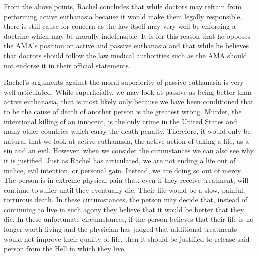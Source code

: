 \documentclass{article}
\begin{document}
From the above points, Rachel concludes that while doctors may refrain from performing
active euthanasia because it would make them legally responsible, there is still cause
for concern as the law itself may very well be enforcing a doctrine which may be morally
indefensible. It is for this reason that he opposes the AMA's position on active and
passive euthanasia and that while he believes that doctors should follow the law
medical authorities such as the AMA should not endorse it in their official statements.

Rachel's arguments against the moral superiority of passive euthanasia is very well-articulated.
While superficially, we may look at passive as being better than active euthanasia,
that is most likely only because we have been conditioned that to be the cause of
death of another person is the greatest wrong. Murder, the intentional killing of
an innocent, is the only crime in the United States and many other countries which
carry the death penalty. Therefore, it would only be natural that we look at active
euthanasia, the active action of taking a life, as a sin and an evil. However, when
we consider the cirumstances we can also see why it is justified. Just as Rachel has
articulated, we are not ending a life out of malice, evil intention, or personal gain.
Instead, we are doing so out of mercy. The person is in extreme physical pain that,
even if they receive treatment, will continue to suffer until they eventually die.
Their life would be a slow, painful, torturous death. In these circumstances, the
person may decide that, instead of continuing to live in such agony they believe that
it would be better that they die. In these unfortunate circumstances, if the person
believes that their life is no longer worth living and the physician has judged that
additional treatments would not improve their quality of life, then it should be justified
to release said person from the Hell in which they live.
\end{document}
